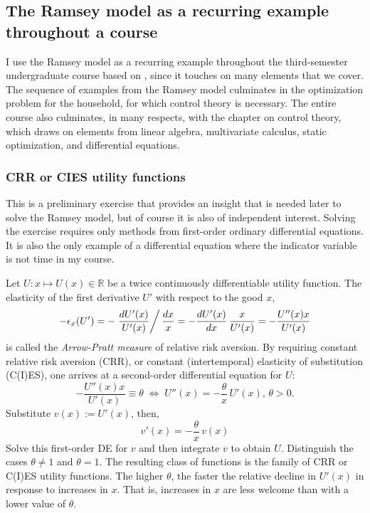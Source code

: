 \documentclass[10pt]{article}
\newcommand{\R}{\mathds{R}}
\begin{document}
\subsection{The Ramsey model as a recurring example throughout a course}

I use the Ramsey model as a recurring example throughout the third-semester undergraduate course based on \cite{Sydsaeter2008}, since it touches on many elements that we cover. The sequence of examples from the Ramsey model culminates in the optimization problem for the household, for which control theory is necessary. The entire course also culminates, in many respects, with the chapter on control theory, which draws on elements from linear algebra, multivariate calculus, static optimization, and differential equations.

\subsubsection{CRR or CIES utility functions}

This is a preliminary exercise that provides an insight that is needed later to solve the Ramsey model, but of course it is also of independent interest. Solving the exercise requires only methods from first-order ordinary differential equations. It is also the only example of a differential equation where the indicator variable is not time in my course.

Let $U : x \mapsto U(x)\in\R$ be a twice continuously differentiable utility function.  The elasticity of the first derivative $U'$ with respect to the good $x$,
\[
    -\epsilon_x(U') = -\left.\frac{dU'(x)}{U'(x)}\right/\frac{dx}{x} = -\frac{dU'(x)}{dx}\, \frac{x}{U'(x)} = -\frac{U''(x) x}{U'(x)}
\]
    is called the \textit{Arrow-Pratt measure} of relative risk
    aversion.  By requiring constant relative risk aversion (CRR), or constant (intertemporal) elasticity of substitution (C(I)ES), one arrives at a second-order differential equation for $U$:
    \[
        -\frac{U''(x) x}{U'(x)} \equiv \theta \; \Longleftrightarrow\; U''(x) = -\frac{\theta}{x}\, U'(x),\, \theta>0.
    \]
    Substitute $v(x) := U'(x)$, then,
    \[
        v'(x) = -\frac{\theta}{x}\, v(x)
    \]
    Solve this first-order DE for $v$ and then integrate $v$ to obtain $U$.  Distinguish the cases $\theta\neq 1$ and $\theta =1$.  The resulting class of functions is the family of CRR or C(I)ES utility functions.  The higher $\theta$, the faster the relative decline in $U'(x)$ in response to increases in $x$.  That is, increases in $x$ are less welcome than with a lower value of $\theta$.
    
\end{document}
